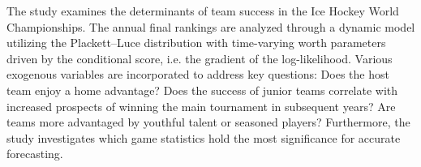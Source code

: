 
\begin{Abstrakt}
    The study examines the determinants of team success in the Ice Hockey World Championships. The annual final rankings are analyzed through a dynamic model utilizing the Plackett–Luce distribution with time-varying worth parameters driven by the conditional score, i.e. the gradient of the log-likelihood. Various exogenous variables are incorporated to address key questions: Does the host team enjoy a home advantage? Does the success of junior teams correlate with increased prospects of winning the main tournament in subsequent years? Are teams more advantaged by youthful talent or seasoned players? Furthermore, the study investigates which game statistics hold the most significance for accurate forecasting.
\end{Abstrakt}



\clearpage